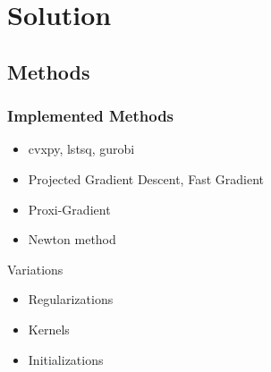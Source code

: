 \documentclass[hyperref={pdfpagelabels=false}]{beamer}
\begin{document}
\section{Solution} 
\subsection{Methods}
\begin{frame}
\frametitle{Implemented Methods}

\begin{itemize}
\item cvxpy, lstsq, gurobi
\item Projected Gradient Descent, Fast Gradient
\item Proxi-Gradient
\item Newton method

\end{itemize}

\begin{block}{Variations}
\begin{itemize}
\item Regularizations
\item Kernels
\item Initializations
\end{itemize}
\end{block}
\end{frame}
\end{document}
